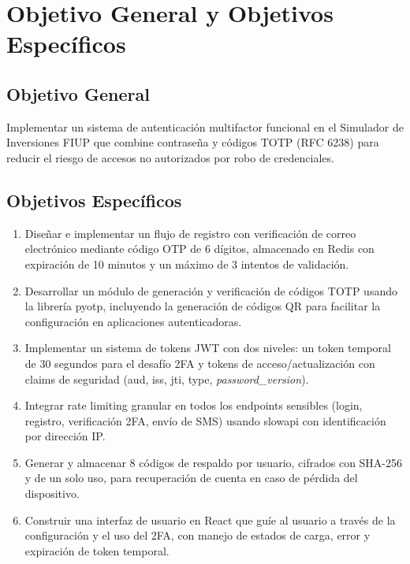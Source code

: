 \documentclass[12pt,letterpaper]{article}
\begin{document}
\section{Objetivo General y Objetivos Espec\'ificos}

\subsection{Objetivo General}

Implementar un sistema de autenticaci\'on multifactor funcional en el Simulador de Inversiones FIUP que combine contrase\~na y c\'odigos TOTP (RFC 6238) para reducir el riesgo de accesos no autorizados por robo de credenciales.

\subsection{Objetivos Espec\'ificos}

\begin{enumerate}[label=\textbf{O\arabic{enumi}}]
    \item Dise\~nar e implementar un flujo de registro con verificaci\'on de correo electr\'onico mediante c\'odigo OTP de 6 d\'igitos, almacenado en Redis con expiraci\'on de 10 minutos y un m\'aximo de 3 intentos de validaci\'on.
    \item Desarrollar un m\'odulo de generaci\'on y verificaci\'on de c\'odigos TOTP usando la librer\'ia pyotp, incluyendo la generaci\'on de c\'odigos QR para facilitar la configuraci\'on en aplicaciones autenticadoras.
    \item Implementar un sistema de tokens JWT con dos niveles: un token temporal de 30 segundos para el desaf\'io 2FA y tokens de acceso/actualizaci\'on con claims de seguridad (aud, iss, jti, type, \textit{password\_version}).
    \item Integrar rate limiting granular en todos los endpoints sensibles (login, registro, verificaci\'on 2FA, env\'io de SMS) usando slowapi con identificaci\'on por direcci\'on IP.
    \item Generar y almacenar 8 c\'odigos de respaldo por usuario, cifrados con SHA-256 y de un solo uso, para recuperaci\'on de cuenta en caso de p\'erdida del dispositivo.
    \item Construir una interfaz de usuario en React que gu\'ie al usuario a trav\'es de la configuraci\'on y el uso del 2FA, con manejo de estados de carga, error y expiraci\'on de token temporal.
\end{enumerate}
\end{document}
